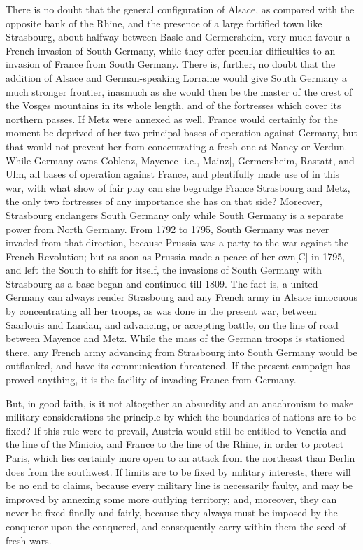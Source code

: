 \documentclass{article}
\begin{document}
There is no doubt that the general configuration of Alsace, as compared
with the opposite bank of the Rhine, and the presence of a large fortified
town like Strasbourg, about halfway between Basle and Germersheim, very
much favour a French invasion of South Germany, while they offer peculiar
difficulties to an invasion of France from South Germany. There is,
further, no doubt that the addition of Alsace and German-speaking Lorraine
would give South Germany a much stronger frontier, inasmuch as she would
then be the master of the crest of the Vosges mountains in its whole
length, and of the fortresses which cover its northern passes. If Metz
were annexed as well, France would certainly for the moment be deprived of
her two principal bases of operation against Germany, but that would not
prevent her from concentrating a fresh one at Nancy or Verdun. While
Germany owns Coblenz, Mayence [i.e., Mainz], Germersheim, Rastatt, and
Ulm, all bases of operation against France, and plentifully made use of in
this war, with what show of fair play can she begrudge France Strasbourg
and Metz, the only two fortresses of any importance she has on that side?
Moreover, Strasbourg endangers South Germany only while South Germany is
a separate power from North Germany. From 1792 to 1795, South Germany was
never invaded from that direction, because Prussia was a party to the war
against the French Revolution; but as soon as Prussia made a peace of her
own[C] in 1795, and left the South to shift for itself, the invasions of
South Germany with Strasbourg as a base began and continued till 1809. The
fact is, a united Germany can always render Strasbourg and any French army
in Alsace innocuous by concentrating all her troops, as was done in the
present war, between Saarlouis and Landau, and advancing, or accepting
battle, on the line of road between Mayence and Metz. While the mass of
the German troops is stationed there, any French army advancing from
Strasbourg into South Germany would be outflanked, and have its
communication threatened. If the present campaign has proved anything, it
is the facility of invading France from Germany.

But, in good faith, is it not altogether an absurdity and an anachronism
to make military considerations the principle by which the boundaries of
nations are to be fixed? If this rule were to prevail, Austria would still
be entitled to Venetia and the line of the Minicio, and France to the line
of the Rhine, in order to protect Paris, which lies certainly more open to
an attack from the northeast than Berlin does from the southwest. If
limits are to be fixed by military interests, there will be no end to
claims, because every military line is necessarily faulty, and may be
improved by annexing some more outlying territory; and, moreover, they can
never be fixed finally and fairly, because they always must be imposed by
the conqueror upon the conquered, and consequently carry within them the
seed of fresh wars.
\end{document}

